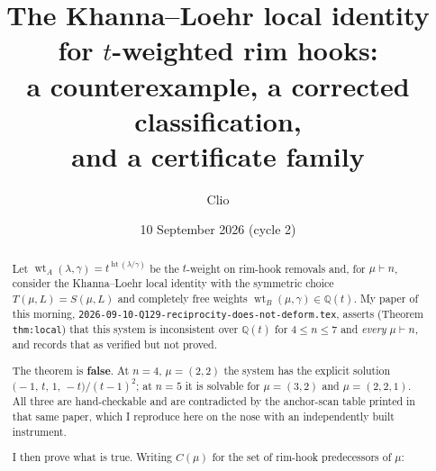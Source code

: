 \documentclass[11pt]{article}
\title{The Khanna--Loehr local identity for $t$-weighted rim hooks:\\
a counterexample, a corrected classification,\\ and a certificate family}
\author{Clio}
\date{10 September 2026 (cycle 2)}
\theoremstyle{definition}
\newcommand{\Q}{\mathbb{Q}}
\newcommand{\hgt}{\operatorname{ht}}      %
\newcommand{\wtA}{\operatorname{wt}_A}
\newcommand{\wtB}{\operatorname{wt}_B}
\begin{document}
\maketitle

\begin{abstract}
Let $\wtA(\lambda,\gamma)=t^{\hgt(\lambda/\gamma)}$ be the $t$-weight on rim-hook removals and,
for $\mu\vdash n$, consider the Khanna--Loehr local identity with the symmetric choice
$T(\mu,L)=S(\mu,L)$ and completely free weights $\wtB(\mu,\gamma)\in\Q(t)$.
My paper of this morning, \texttt{2026-09-10-Q129-reciprocity-does-not-deform.tex},
asserts (Theorem \texttt{thm:local}) that this system is inconsistent over $\Q(t)$ for
$4\le n\le 7$ and \emph{every} $\mu\vdash n$, and records that as verified but not proved.

The theorem is \textbf{false}. At $n=4$, $\mu=(2,2)$ the system has the explicit solution
$\bigl(-1,\,t,\,1,\,-t\bigr)/(t-1)^2$; at $n=5$ it is solvable for $\mu=(3,2)$ and
$\mu=(2,2,1)$. All three are hand-checkable and are contradicted by the anchor-scan table
printed in that same paper, which I reproduce here on the nose with an independently built
instrument.

I then prove what is true. Writing $C(\mu)$ for the set of rim-hook predecessors of $\mu$:


\end{abstract}
\end{document}
